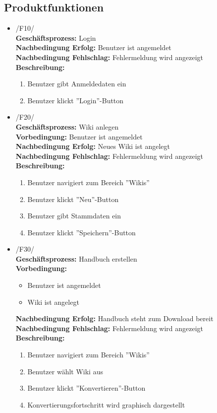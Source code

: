 \label{app:pflichtenheft}

\subsection*{Produktfunktionen}

	\begin{itemize}
		\item 
			/F10/ \\
			\textbf{Geschäftsprozess:} Login \\
			\textbf{Nachbedingung Erfolg:} Benutzer ist angemeldet \\
			\textbf{Nachbedingung Fehlschlag:} Fehlermeldung wird angezeigt \\
			\textbf{Beschreibung:}
			\begin{enumerate}
				\item Benutzer gibt Anmeldedaten ein
				\item Benutzer klickt ''Login''-Button
			\end{enumerate}
		\item 
			/F20/ \\
			\textbf{Geschäftsprozess:} Wiki anlegen \\
			\textbf{Vorbedingung:} Benutzer ist angemeldet \\
			\textbf{Nachbedingung Erfolg:} Neues Wiki ist angelegt \\
			\textbf{Nachbedingung Fehlschlag:} Fehlermeldung wird angezeigt \\
			\textbf{Beschreibung:}
			\begin{enumerate}
				\item Benutzer navigiert zum Bereich ''Wikis''
				\item Benutzer klickt ''Neu''-Button
				\item Benutzer gibt Stammdaten ein
				\item Benutzer klickt ''Speichern''-Button
			\end{enumerate}
		\item 
			/F30/ \\
			\textbf{Geschäftsprozess:} Handbuch erstellen \\
			\textbf{Vorbedingung:}
			\begin{itemize}
				\item Benutzer ist angemeldet
				\item Wiki ist angelegt
			\end{itemize}
			\textbf{Nachbedingung Erfolg:} Handbuch steht zum Download bereit \\
			\textbf{Nachbedingung Fehlschlag:} Fehlermeldung wird angezeigt \\
			\textbf{Beschreibung:}
			\begin{enumerate}
				\item Benutzer navigiert zum Bereich ''Wikis''
				\item Benutzer wählt Wiki aus
				\item Benutzer klickt ''Konvertieren''-Button
				\item Konvertierungsfortschritt wird graphisch dargestellt
			\end{enumerate}
	\end{itemize}